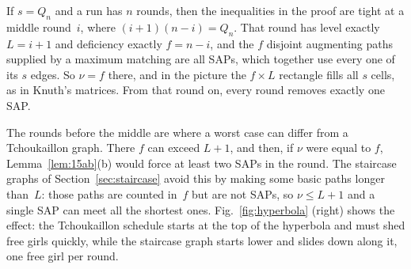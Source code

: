 If $s=Q_n$ and a run has $n$ rounds, then the inequalities in the proof
are tight at a middle round~$i$, where $(i+1)(n-i)=Q_n$. That round has
level exactly $L=i+1$ and deficiency exactly $f=n-i$, and the $f$
disjoint augmenting paths supplied by a maximum matching are all SAPs,
which together use every one of its $s$ edges. So $\nu=f$ there, and in
the picture the $f\times L$ rectangle fills all $s$ cells, as in Knuth's
matrices. From that round on, every round removes exactly one SAP.

The rounds before the middle are where a worst case can differ from a
Tchoukaillon graph. There $f$ can exceed $L+1$, and then, if $\nu$ were
equal to $f$, Lemma~\ref{lem:15ab}(b) would force at least two SAPs in the
round. The
staircase graphs of Section~\ref{sec:staircase} avoid this by making some
basic paths longer than~$L$: those paths are counted in~$f$ but are not
SAPs, so $\nu\le L+1$ and a single SAP can meet all the shortest ones.
Fig.~\ref{fig:hyperbola} (right) shows the effect: the Tchoukaillon
schedule starts at the top of the hyperbola and must shed free girls
quickly, while the staircase graph starts lower and slides down along it,
one free girl per round.
